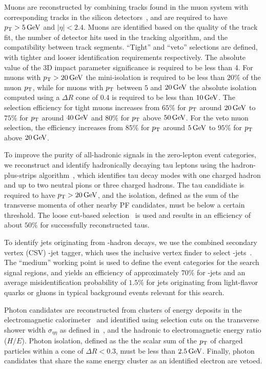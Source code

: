 Muons are reconstructed by combining tracks found in the muon system with 
corresponding tracks in the silicon detectors~\cite{Chatrchyan:2012xi},
and are required to have $p_{\mathrm{T}} > 5 \,\text{Ge\hspace{-.08em}V}$ and $|\eta|<2.4$. Muons are identified
based on the quality of the track fit, the number of detector hits used in the 
tracking algorithm, and the compatibility between track segments. 
``Tight'' and ``veto'' selections are defined, with tighter and looser 
identification requirements respectively. The absolute value of the 3D impact 
parameter significance is required to be less than 4. For muons with 
$p_{\mathrm{T}} > 20 \,\text{Ge\hspace{-.08em}V}$ the mini-isolation is required to be less than $20\%$
of the muon $p_{\mathrm{T}}$, while for muons with $p_{\mathrm{T}}$ between $5$ and $20 \,\text{Ge\hspace{-.08em}V}$
the absolute isolation computed using a $\Delta R$ cone of $0.4$ 
is required to be less than $10 \,\text{Ge\hspace{-.08em}V}$. 
The selection efficiency for tight muons increases from $65\%$ for
$p_{\mathrm{T}}$ around $20 \,\text{Ge\hspace{-.08em}V}$
to $75\%$ for $p_{\mathrm{T}}$ around $40 \,\text{Ge\hspace{-.08em}V}$ and $80\%$ for $p_{\mathrm{T}}$ above $50 \,\text{Ge\hspace{-.08em}V}$. 
For the veto muon selection, the efficiency increases from $85\%$ for
$p_{\mathrm{T}}$ around $5 \,\text{Ge\hspace{-.08em}V}$
to $95\%$ for $p_{\mathrm{T}}$ above $20 \,\text{Ge\hspace{-.08em}V}$. 

To improve the purity of all-hadronic signals in the zero-lepton event categories,
we reconstruct and identify hadronically decaying tau leptons using the
hadron-plus-strips algorithm~\cite{Khachatryan:2015dfa}, which identifies tau decay modes
with one charged hadron and up to two neutral pions or three charged hadrons.
The tau candidiate is required to have $p_{\mathrm{T}}>20 \,\text{Ge\hspace{-.08em}V}$, and the isolation, defined as the 
sum of the transverse momenta of other nearby PF candidates, must be below a certain threshold. 
The loose cut-based selection~\cite{Khachatryan:2015dfa} is used and results in an efficiency
of about $50\%$ for successfully reconstructed taus.

To identify jets originating from \PB-hadron decays, we use the
combined secondary vertex (CSV) \cPqb-jet tagger, which uses the inclusive
vertex finder to select \cPqb-jets~\cite{CMS-PAS-BTV-15-001}. The ``medium'' 
working point is used to define the event categories for the search signal regions,
and yields an efficiency of approximately $70\%$ for \cPqb-jets and an average 
misidentification probability of $1.5\%$ for jets originating from light-flavor 
quarks or gluons in typical background events relevant for this search.

Photon candidates are reconstructed from clusters of energy deposits in the electromagnetic
calorimeter~\cite{Khachatryan:2015iwa} and identified using 
selection cuts on the transverse shower width $\sigma_{\eta\eta}$ as defined 
in~\cite{Khachatryan:2015iwa}, and the hadronic to electromagnetic energy ratio ($H/E$). 
Photon isolation, defined as the 
the scalar sum of the $p_{\mathrm{T}}$ of charged particles within a cone of
$\Delta R<0.3$, must be less than $2.5 \,\text{Ge\hspace{-.08em}V}$. Finally, photon candidates that share
the same energy cluster as an identified electron are vetoed. 


